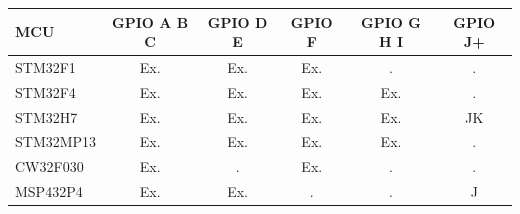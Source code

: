 \begin{itemize}
\begin{longtable}{|l|c|c|c|c|c|}
\hline
\hline
MCU & \textbf{GPIO A B C} & \textbf{GPIO D E} & \textbf{GPIO F} & \textbf{GPIO G H I} & \textbf{GPIO J+} \\
\hline
\endhead
\hline
\endfoot
\hline
\endlastfoot
STM32F1 & Ex. & Ex. & Ex. & . & . \\
\hline
STM32F4 & Ex. & Ex. & Ex. & Ex. & . \\
\hline
STM32H7 & Ex. & Ex. & Ex. & Ex. & JK \\
\hline
STM32MP13 & Ex. & Ex. & Ex. & Ex. & . \\
\hline
CW32F030 & Ex. & . & Ex. & . & . \\
\hline
MSP432P4 & Ex. & Ex. & . & . & J \\
\hline

\end{longtable}

\end{itemize}


